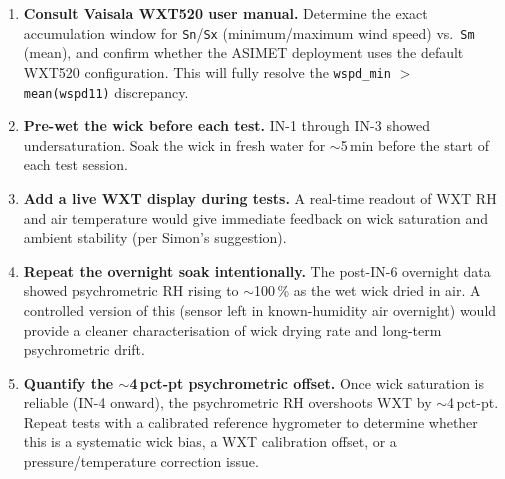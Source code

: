\documentclass[11pt,letterpaper]{article}
\begin{document}
\begin{enumerate}
  \item \textbf{Consult Vaisala WXT520 user manual.}
    Determine the exact accumulation window for \texttt{Sn}/\texttt{Sx}
    (minimum/maximum wind speed) vs.\ \texttt{Sm} (mean), and confirm whether
    the ASIMET deployment uses the default WXT520 configuration.
    This will fully resolve the \texttt{wspd\_min} $>$ \texttt{mean(wspd11)}
    discrepancy.

  \item \textbf{Pre-wet the wick before each test.}
    IN-1 through IN-3 showed undersaturation.  Soak the wick in fresh water
    for $\sim$5\,min before the start of each test session.

  \item \textbf{Add a live WXT display during tests.}
    A real-time readout of WXT RH and air temperature would give immediate
    feedback on wick saturation and ambient stability (per Simon's suggestion).

  \item \textbf{Repeat the overnight soak intentionally.}
    The post-IN-6 overnight data showed psychrometric RH rising to
    $\sim$100\,\% as the wet wick dried in air.  A controlled version of this
    (sensor left in known-humidity air overnight) would provide a cleaner
    characterisation of wick drying rate and long-term psychrometric drift.

  \item \textbf{Quantify the $\sim$4\,pct-pt psychrometric offset.}
    Once wick saturation is reliable (IN-4 onward), the psychrometric RH
    overshoots WXT by $\sim$4\,pct-pt.  Repeat tests with a calibrated
    reference hygrometer to determine whether this is a systematic wick bias,
    a WXT calibration offset, or a pressure/temperature correction issue.
\end{enumerate}
\end{document}
